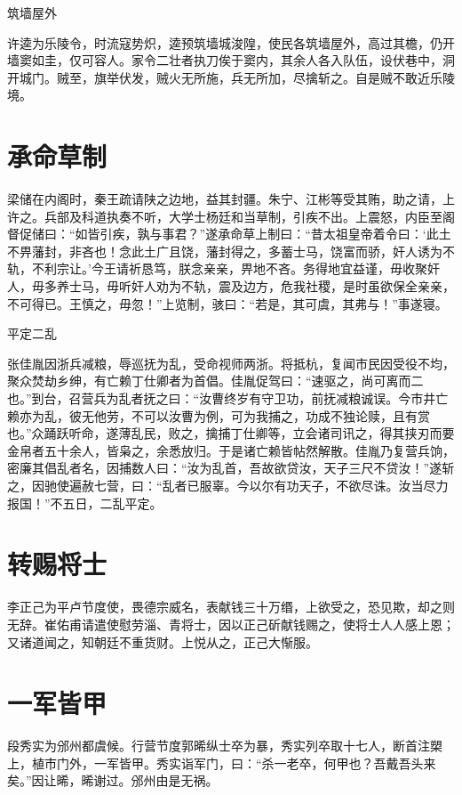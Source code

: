 \documentclass[a4paper,12pt,UTF8,twoside]{ctexbook}
\begin{document}
    筑墙屋外
    
    许逵为乐陵令，时流寇势炽，逵预筑墙城浚隍，使民各筑墙屋外，高过其檐，仍开墙窦如圭，仅可容人。家令二壮者执刀俟于窦内，其余人各入队伍，设伏巷中，洞开城门。贼至，旗举伏发，贼火无所施，兵无所加，尽擒斩之。自是贼不敢近乐陵境。
    
    \section{承命草制}
    
    梁储在内阁时，秦王疏请陕之边地，益其封疆。朱宁、江彬等受其贿，助之请，上许之。兵部及科道执奏不听，大学士杨廷和当草制，引疾不出。上震怒，内臣至阁督促储曰：“如皆引疾，孰与事君？”遂承命草上制曰：“昔太祖皇帝着令曰：‘此土不畀藩封，非吝也！念此土广且饶，藩封得之，多蓄士马，饶富而骄，奸人诱为不轨，不利宗让。’今王请祈恳笃，朕念亲亲，畀地不吝。务得地宜益谨，毋收聚奸人，毋多养士马，毋听奸人劝为不轨，震及边方，危我社稷，是时虽欲保全亲亲，不可得已。王慎之，毋忽！”上览制，骇曰：“若是，其可虞，其弗与！”事遂寝。
    
    平定二乱
    
    张佳胤因浙兵减粮，辱巡抚为乱，受命视师两浙。将抵杭，复闻市民因受役不均，聚众焚劫乡绅，有亡赖丁仕卿者为首倡。佳胤促驾曰：“速驱之，尚可离而二也。”到台，召营兵为乱者抚之曰：“汝曹终岁有守卫功，前抚减粮诚误。今市井亡赖亦为乱，彼无他劳，不可以汝曹为例，可为我捕之，功成不独论赎，且有赏也。”众踊跃听命，遂薄乱民，败之，擒捕丁仕卿等，立会诸司讯之，得其挟刃而要金帛者五十余人，皆枭之，余悉放归。于是诸亡赖皆帖然解散。佳胤乃复营兵饷，密廉其倡乱者名，因捕数人曰：“汝为乱首，吾故欲贷汝，天子三尺不贷汝！”遂斩之，因驰使遍赦七营，曰：“乱者已服辜。今以尔有功天子，不欲尽诛。汝当尽力报国！”不五日，二乱平定。
    
    \section{转赐将士}
    
    李正己为平卢节度使，畏德宗威名，表献钱三十万缗，上欲受之，恐见欺，却之则无辞。崔佑甫请遣使慰劳淄、青将士，因以正己斫献钱赐之，使将士人人感上恩；又诸道闻之，知朝廷不重货财。上悦从之，正己大惭服。
    
    \section{一军皆甲}
    
    段秀实为邠州都虞候。行营节度郭晞纵士卒为暴，秀实列卒取十七人，断首注槊上，植市门外，一军皆甲。秀实诣军门，曰：“杀一老卒，何甲也？吾戴吾头来矣。”因让晞，晞谢过。邠州由是无祸。
    
\end{document}
